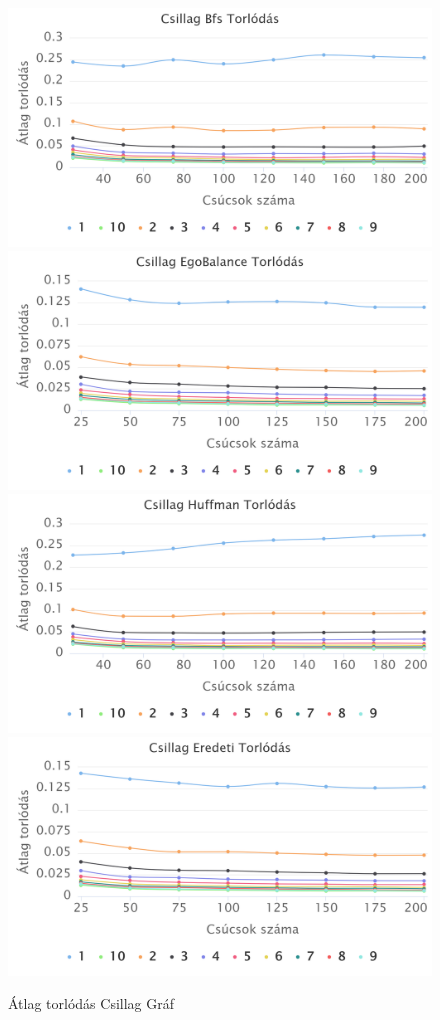 \documentclass[12pt]{report}
\begin{document}
\begin{figure}[h]
	\begin{center}
		\includegraphics[width=0.49\linewidth]{pictures/star_con_bfs.png}
		\includegraphics[width=0.49\linewidth]{pictures/star_con_egobalance.png}
		\includegraphics[width=0.49\linewidth]{pictures/star_con_huffman.png}
		\includegraphics[width=0.49\linewidth]{pictures/star_con_original.png}
		\caption{Átlag torlódás Csillag Gráf}
		\label{avg-len}
	\end{center}
\end{figure}
\end{document}
